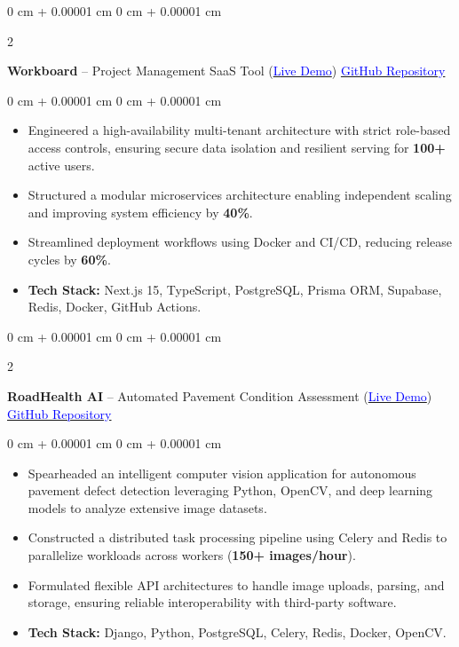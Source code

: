 \documentclass[9pt, letterpaper]{article}
\newenvironment{highlights}{
    \begin{itemize}[
        topsep=0.04 cm,
        parsep=0.04 cm,
        partopsep=0pt,
        itemsep=0pt,
        leftmargin=0.4 cm + 10pt
    ]
}{
    \end{itemize}
} %
\newenvironment{onecolentry}{
    \begin{adjustwidth}{
        0 cm + 0.00001 cm
    }{
        0 cm + 0.00001 cm
    }
}{
    \end{adjustwidth}
} %
\newenvironment{twocolentry}[2][]{%
    \onecolentry
    \def\secondColumn{#2}
    \setcolumnwidth{\fill, 4.5 cm}
    \begin{paracol}{2}
}{%
    \switchcolumn \raggedleft \secondColumn
    \end{paracol}
    \end{onecolentry}
}
\begin{document}
    \vspace{0.15 cm}
    \begin{twocolentry}{\href{https://github.com/vamsi-lpu18/work_board}{\textcolor{blue}{GitHub Repository}}}
        \textbf{Workboard} -- Project Management SaaS Tool
        (\href{https://workboard-dev.vercel.app}{\textcolor{blue}{Live Demo}})
    \end{twocolentry}
    \vspace{0.10 cm}
    \begin{onecolentry}
        \begin{highlights}
              \item Engineered a high-availability multi-tenant architecture with strict role-based access controls, ensuring secure data isolation and resilient serving for \textbf{100+} active users.
              \item Structured a modular microservices architecture enabling independent scaling and improving system efficiency by \textbf{40\%}.
              \item Streamlined deployment workflows using Docker and CI/CD, reducing release cycles by \textbf{60\%}.
              \item \textbf{Tech Stack:} Next.js 15, TypeScript, PostgreSQL, Prisma ORM, Supabase, Redis, Docker, GitHub Actions.
        \end{highlights}
    \end{onecolentry}

    \vspace{0.15 cm}
    \begin{twocolentry}{\href{https://github.com/vamsi-lpu18/RoadHealth-AI-Automated-Pavement-Condition-Assessment-from-Photographs}{\textcolor{blue}{GitHub Repository}}}
        \textbf{RoadHealth AI} -- Automated Pavement Condition Assessment
        (\href{https://roadhealth-ai-automated-pavement-uyar.onrender.com/}{\textcolor{blue}{Live Demo}})
    \end{twocolentry}
    \vspace{0.10 cm}
    \begin{onecolentry}
        \begin{highlights}
              \item Spearheaded an intelligent computer vision application for autonomous pavement defect detection leveraging Python, OpenCV, and deep learning models to analyze extensive image datasets.
              \item Constructed a distributed task processing pipeline using Celery and Redis to parallelize workloads across workers (\textbf{150+ images/hour}).
              \item Formulated flexible API architectures to handle image uploads, parsing, and storage, ensuring reliable interoperability with third-party software.
              \item \textbf{Tech Stack:} Django, Python, PostgreSQL, Celery, Redis, Docker, OpenCV.
        \end{highlights}
    \end{onecolentry}
\end{document}
